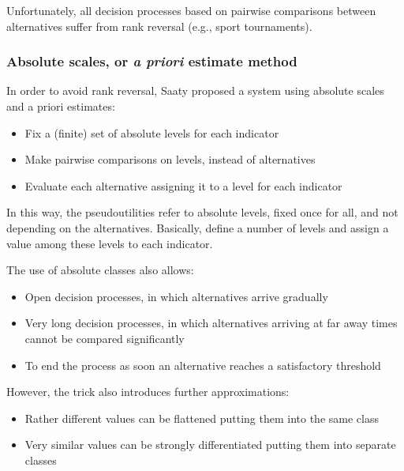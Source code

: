 Unfortunately, all decision processes based on pairwise comparisons between alternatives suffer from rank reversal (e.g., sport tournaments).

\subsubsection{Absolute scales, or \textit{a priori} estimate method}

In order to avoid rank reversal, Saaty proposed a system using absolute scales and a priori estimates: 
\begin{itemize}
	\item Fix a (finite) set of absolute levels for each indicator
	
	\item Make pairwise comparisons on levels, instead of alternatives 
	
	\item Evaluate each alternative assigning it to a level for each indicator
\end{itemize}

In this way, the pseudoutilities refer to absolute levels, fixed once for all, and not depending on the alternatives. Basically, define a number of levels and assign a value among these levels to each indicator.

The use of absolute classes also allows:
\begin{itemize}
	\item Open decision processes, in which alternatives arrive gradually
	
	\item Very long decision processes, in which alternatives arriving at far away times cannot be compared significantly
	
	\item To end the process as soon an alternative reaches a satisfactory threshold 
\end{itemize}

However, the trick also introduces further approximations:
\begin{itemize}
	\item Rather different values can be flattened putting them into the same class 
	
	\item Very similar values can be strongly differentiated putting them into separate classes
\end{itemize}

